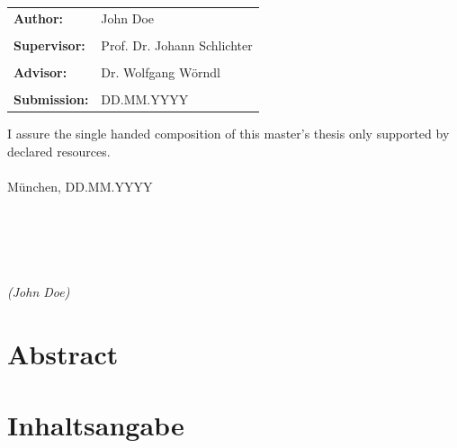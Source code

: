 \documentclass[12pt,oneside, reqno]{report}
\begin{document}
\begin{tabular}{ll}
{\Large \bf Author:} & {\Large John Doe} \\\\
{\Large \bf Supervisor:} & {\Large Prof. Dr. Johann Schlichter} \\\\
{\Large \bf Advisor:} & {\Large Dr. Wolfgang Wörndl} \\\\
{\Large \bf Submission:} & {\Large DD.MM.YYYY}
\end{tabular}

\newpage	
\thispagestyle{empty}
\hoffset=0mm
\vspace*{\fill}
\noindent I assure the single handed composition of this master's thesis only supported by declared resources.\\\\
München, DD.MM.YYYY\\\\\\\\\\\\
\noindent \textit{(John Doe)}

\newpage
\thispagestyle{empty}
\null

\newpage
\thispagestyle{empty}
\hoffset=0mm
\section*{Abstract}	
\begin{spacing}{1.2}

\end{spacing}
	
\section*{Inhaltsangabe}
\begin{spacing}{1.2}

\end{spacing}

\newpage
\setcounter{page}{1}
\hoffset=0mm
\setcounter{tocdepth}{3}
\setcounter{secnumdepth}{3}
\fboxsep 0mm


\newpage
{}



\tableofcontents

\newpage
\setlength{\baselineskip}{3ex}

\begin{spacing}{1.15}
\end{spacing}
\newpage
\thispagestyle{empty}
\null
\end{document}
